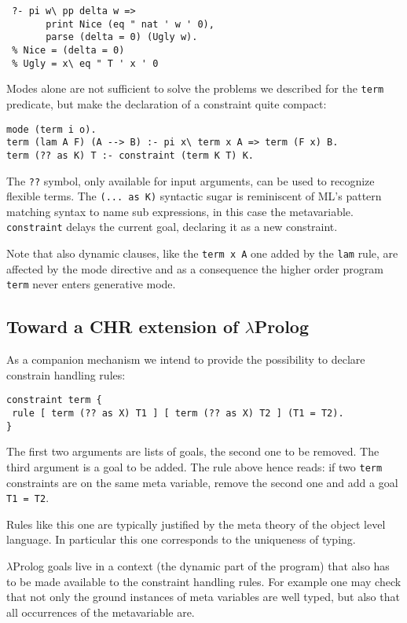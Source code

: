\documentclass[preprint]{sigplanconf}
\begin{document}
{\small
\begin{verbatim}
 ?- pi w\ pp delta w =>
       print Nice (eq " nat ' w ' 0),
       parse (delta = 0) (Ugly w).
 % Nice = (delta = 0)
 % Ugly = x\ eq " T ' x ' 0
\end{verbatim}
}

Modes alone are not sufficient to solve the problems we described for
the \verb+term+ predicate, but make the declaration of a constraint
quite compact:

{\small
\begin{verbatim}
mode (term i o).
term (lam A F) (A --> B) :- pi x\ term x A => term (F x) B.
term (?? as K) T :- constraint (term K T) K.
\end{verbatim}
}

The \verb+??+ symbol, only available for input arguments, can be used to
recognize flexible terms.  The \verb+(... as K)+ syntactic sugar is reminiscent of
ML's pattern matching syntax to name sub expressions, in this case the
metavariable.
\verb+constraint+ delays the current goal, declaring it as a new constraint.

Note that also dynamic clauses, like the \verb+term x A+ one 
added by the
\verb+lam+ rule, are affected by the mode directive and as a consequence
the higher order program \verb+term+ never enters generative mode.

\subsection{Toward a CHR extension of $\lambda$Prolog}

As a companion mechanism we intend to provide the possibility to
declare constrain handling rules:

{\small
\begin{verbatim}
constraint term {
 rule [ term (?? as X) T1 ] [ term (?? as X) T2 ] (T1 = T2).
}
\end{verbatim}
}

The first two
arguments are lists of goals, the second one to be removed.  The third argument
is a goal to be added. The rule
above hence reads: if two \verb+term+ constraints are on the same meta variable,
remove the second one and add a goal \verb+T1 = T2+.

Rules like this one are typically justified by the meta theory of the
object level language.  In particular this one corresponds to the uniqueness
of typing.

$\lambda$Prolog goals live in a context (the dynamic part of the program)
that also has to be made available to
the constraint handling rules.  For example one may check that not only the
ground instances of meta variables are well typed, but also that all occurrences of the
metavariable are.
\end{document}
